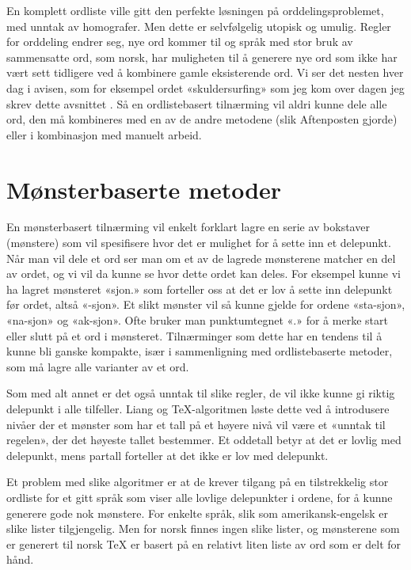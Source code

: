 En komplett ordliste ville gitt den perfekte løsningen på orddelingsproblemet, med unntak av homografer. Men dette er selvfølgelig utopisk og umulig. Regler for orddeling endrer seg, nye ord kommer til og språk med stor bruk av sammensatte ord, som norsk, har muligheten til å generere nye ord som ikke har vært sett tidligere ved å kombinere gamle eksisterende ord. Vi ser det nesten hver dag i avisen, som for eksempel ordet «skuldersurfing» som jeg kom over dagen jeg skrev dette avsnittet \cite{skuldersurfing}. Så en ordlistebasert tilnærming vil aldri kunne dele alle ord, den må kombineres med en av de andre metodene (slik Aftenposten gjorde) eller i kombinasjon med manuelt arbeid.

\section{Mønsterbaserte metoder}

En mønsterbasert tilnærming vil enkelt forklart lagre en serie av bokstaver (mønstere) som vil spesifisere hvor det er mulighet for å sette inn et delepunkt. Når man vil dele et ord ser man om et av de lagrede mønsterene matcher en del av ordet, og vi vil da kunne se hvor dette ordet kan deles. For eksempel kunne vi ha lagret mønsteret «sjon.» som forteller oss at det er lov å sette inn delepunkt før ordet, altså «-sjon». Et slikt mønster vil så kunne gjelde for ordene «sta-sjon», «na-sjon» og «ak-sjon». Ofte bruker man punktumtegnet «.» for å merke start eller slutt på et ord i mønsteret. Tilnærminger som dette har en tendens til å kunne bli ganske kompakte, især i sammenligning med ordlistebaserte metoder, som må lagre alle varianter av et ord. 

Som med alt annet er det også unntak til slike regler, de vil ikke kunne gi riktig delepunkt i alle tilfeller. Liang og \TeX{}-algoritmen løste dette ved å introdusere nivåer der et mønster som har et tall på et høyere nivå vil være et «unntak til regelen», der det høyeste tallet bestemmer. Et oddetall betyr at det er lovlig med delepunkt, mens partall forteller at det ikke er lov med delepunkt. \cite{liang1983word}

Et problem med slike algoritmer er at de krever tilgang på en tilstrekkelig stor ordliste for et gitt språk som viser alle lovlige delepunkter i ordene, for å kunne generere gode nok mønstere. For enkelte språk, slik som amerikansk-engelsk er slike lister tilgjengelig. Men for norsk finnes ingen slike lister, og mønsterene som er generert til norsk \TeX{} er basert på en relativt liten liste av ord som er delt for hånd. \cite{thoresen1993virtuelle}

